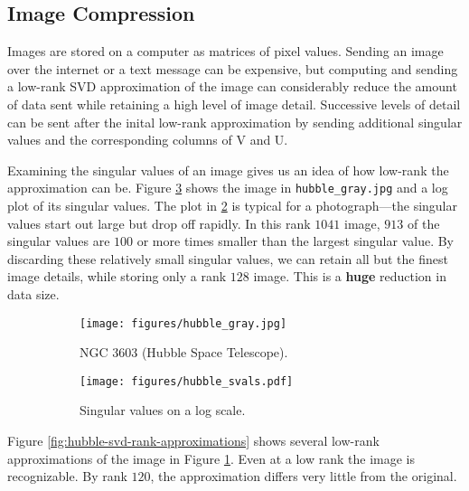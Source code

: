 \subsection*{Image Compression} %

Images are stored on a computer as matrices of pixel values.
Sending an image over the internet or a text message can be expensive, but computing and sending a low-rank SVD approximation of the image can considerably reduce the amount of data sent while retaining a high level of image detail.
Successive levels of detail can be sent after the inital low-rank approximation by sending additional singular values and the corresponding columns of V and U.

Examining the singular values of an image gives us an idea of how low-rank the approximation can be.
Figure \ref{fig:hubble} shows the image in \texttt{hubble\_gray.jpg} and a log plot of its singular values.
The plot in \ref{fig:hubble-log-svals} is typical for a photograph---the singular values start out large but drop off rapidly.
In this rank $1041$ image, $913$ of the singular values are $100$ or more times smaller than the largest singular value.
By discarding these relatively small singular values, we can retain all but the finest image details, while storing only a rank $128$ image.
This is a \textbf{huge} reduction in data size.

\begin{figure}[H] %
\captionsetup[subfigure]{justification=centering}
\centering
\begin{subfigure}{.49\textwidth}
    \centering
    \texttt{[image: figures/hubble\_gray.jpg]}
    \caption{NGC 3603 (Hubble Space Telescope).}
    \label{fig:hubble-original-gray}
\end{subfigure}
%
\begin{subfigure}{.49\textwidth}
    \centering
    \texttt{[image: figures/hubble\_svals.pdf]}
    \caption{Singular values on a log scale.}
    \label{fig:hubble-log-svals}
\end{subfigure}
\caption{}
\label{fig:hubble}
\end{figure}

Figure \ref{fig:hubble-svd-rank-approximations} shows several low-rank approximations of the image in Figure \ref{fig:hubble-original-gray}.
Even at a low rank the image is recognizable.
By rank $120$, the approximation differs very little from the original.

